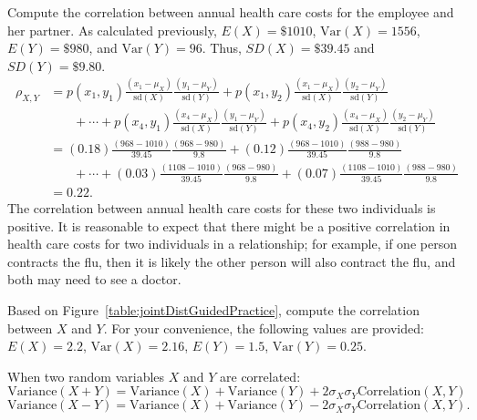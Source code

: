 \begin{examplewrap}
\begin{nexample}{Compute the correlation between annual health care costs for the employee and her partner.} 
As calculated previously, $E(X) = \$1010$, $\textrm{Var}(X) = 1556$, $E(Y) = \$980$, and $\textrm{Var}(Y)= 96$. Thus, $SD(X) = \$39.45$ and $SD(Y) = \$9.80$.
	\begin{align*}
	\rho_{X,Y} &= p(x_1,y_1) \frac{(x_1 - \mu_X)}{\textrm{sd}(X)}\frac{(y_1 - \mu_Y)}{\textrm{sd}(Y)} 
	+ p(x_1,y_2)\frac{(x_1 - \mu_X)}{\textrm{sd}(X)}\frac{(y_2 - \mu_Y)}{\textrm{sd}(Y)}  \\
	&\phantom{{}=1} + \cdots + p(x_4,y_1)\frac{(x_4 - \mu_X)}{\textrm{sd}(X)}\frac{(y_1 - \mu_Y)}{\textrm{sd}(Y)} + p(x_4,y_2)\frac{(x_4 - \mu_X)}{\textrm{sd}(X)}\frac{(y_2 - \mu_Y)}{\textrm{sd}(Y)} \\
	&= (0.18) \frac{(968 - 1010)}{39.45}\frac{(968 - 980)}{9.8} 
	+ (0.12)\frac{(968 - 1010)}{39.45}\frac{(988 - 980)}{9.8}  \\
	&\phantom{{}=1} + \cdots + (0.03)\frac{(1108 - 1010)}{39.45}\frac{(968 - 980)}{9.8} + (0.07)\frac{(1108 - 1010)}{39.45}\frac{(988 - 980)}{9.8} \\
	&= 0.22.
	\end{align*} 
	The correlation between annual health care costs for these two individuals is positive. It is reasonable to expect that there might be a positive correlation in health care costs for two individuals in a relationship; for example, if one person contracts the flu, then it is likely the other person will also contract the flu, and both may need to see a doctor.
\end{nexample}
\end{examplewrap}

\begin{exercisewrap}
\begin{nexercise}
Based on Figure~\ref{table:jointDistGuidedPractice}, compute the correlation between $X$ and $Y$. For your convenience, the following values are provided: $E(X) = 2.2$, $\text{Var}(X) = 2.16$, $E(Y) = 1.5$, $\text{Var}(Y) = 0.25$.\footnotemark{}
\end{nexercise}
\end{exercisewrap}

When two random variables $X$ and $Y$ are correlated:
\begin{equation} 
\text{Variance}(X + Y) = \text{Variance}(X) + \text{Variance}(Y) + 
2 \sigma_X \sigma_Y\text{Correlation}(X,Y) 
\label{eq:generalVarianceSumRVs}
\end{equation}
\begin{equation}
\text{Variance}(X - Y) = \text{Variance}(X) + \text{Variance}(Y) - 
2 \sigma_X \sigma_Y\text{Correlation}(X,Y). 
\label{eq:generalVarianceDiffRVs}
\end{equation}

